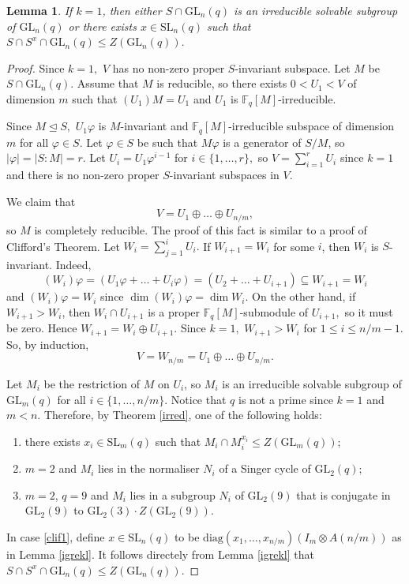 \documentclass[a4paper,reqno,11pt]{amsart}
\newtheorem{Lem}[Th]{Lemma}
\theoremstyle{definition}
\theoremstyle{remark}
\numberwithin{equation}{section}
\newcommand{\diag}{\mathrm{diag}}
\newcommand{\SL}{{\mathrm{SL}}}
\newcommand{\GL}{{\mathrm{GL}}}
\begin{document}
 
 \begin{Lem}
 \label{GammairGL}
 If $k=1$, then either $S \cap \GL_n(q)$   is an irreducible solvable subgroup of $\GL_n(q)$ or there exists $x \in \SL_n(q)$ such that $S \cap S^x \cap \GL_n(q) \le Z(\GL_n(q)).$
 \end{Lem}
 \begin{proof}
 Since $k=1,$  $V$ has no  non-zero proper $S$-invariant subspace. Let $M$ be $S \cap \GL_n(q).$ Assume that $M$ is reducible, so there exists $0<U_1 <V$ of dimension $m$ such that $(U_1)M=U_1$ and $U_1$ is $\mathbb{F}_q[M]$-irreducible.
 
 Since $M \trianglelefteq S,$ $U_1 \varphi$ is $M$-invariant and $\mathbb{F}_q[M]$-irreducible subspace of dimension $m$ for all $\varphi \in S.$    Let $\varphi \in S$ be such that $M \varphi$ is a generator of $S/M$, so $|\varphi|=|S:M|=r.$ Let $U_i=U_1 \varphi^{i-1}$ for $i \in \{1, \ldots, r\},$ so $V=\sum_{i=1}^r U_i$ since $k=1$ and there is no non-zero proper $S$-invariant subspaces in $V$.

We claim that $$V=U_1 \oplus \ldots \oplus U_{n/m},$$
so $M$ is completely reducible. The proof of this fact is similar to a proof of Clifford's Theorem. Let $W_i=\sum_{j=1}^i U_i.$ If  $W_{i+1}=W_i$ for some $i$, then $W_{i}$ is $S$-invariant. Indeed,
$$(W_i)\varphi=(U_1 \varphi + \ldots + U_i \varphi)=(U_2 + \ldots + U_{i+1})\subseteq W_{i+1}=W_i$$
 and $(W_i)\varphi=W_i$ since $\dim (W_i)\varphi = \dim W_i.$ On the other hand, if $W_{i+1}>W_i$, then  $W_i \cap U_{i+1}$ is a proper $\mathbb{F}_q[M]$-submodule of $U_{i+1},$ so it must be zero. Hence  $W_{i+1}=W_i\oplus U_{i+1}$. Since $k=1,$ $W_{i+1}>W_i$ for $1 \le i \le n/m -1.$ So, by induction, 
 $$V=W_{n/m}=U_1 \oplus \ldots \oplus U_{n/m}.$$
 
  Let $M_i$ be the restriction of $M$ on $U_i$, so $M_i$ is an irreducible solvable subgroup of $\GL_m(q)$ for all $i \in \{1, \ldots, n/m\}.$ Notice that $q$ is not a prime since $k=1$ and $m<n$. Therefore, by Theorem \ref{irred}, one of the following holds:
  \begin{enumerate}
  \item  there exists $x_i \in \SL_m(q)$ such that $M_i \cap M_i^{x_i} \le Z(\GL_m(q))$; \label{clif1}
  \item  $m=2$ and $M_i$ lies in the normaliser $N_i$ of a Singer cycle of $\GL_2(q);$ \label{clif2}
  \item $m=2$, $q=9$ and $M_i$ lies in a subgroup $N_i$ of $\GL_2(9)$ that is conjugate in $\GL_2(9)$ to  $\GL_2(3) \cdot Z(\GL_2(9)).$ \label{clif3} 
\end{enumerate}  
In  case \ref{clif1}, define $x \in \SL_n(q)$ to be $\diag(x_1, \ldots, x_{n/m}) (I_m \otimes A(n/m))$ as in Lemma  \ref{igrekl}. It follows directely from Lemma \ref{igrekl} that $S \cap S^x \cap \GL_n(q) \le Z(\GL_n(q)).$


\end{proof}
\end{document}
